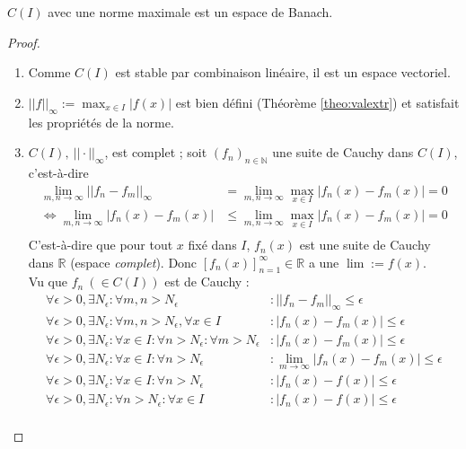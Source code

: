\begin{theo}
    $C(I)$ avec une norme maximale est un espace de Banach.
\end{theo}

\begin{proof}
    \begin{enumerate}[label=(\roman*)]
        \item Comme $C(I)$ est stable par combinaison linéaire, il est un espace vectoriel.
        \item $||f||_\infty := \max_{x\in I}|f(x)|$ est bien défini (Théorème \ref{theo:valextr}) et satisfait les propriétés de la norme.
        \item $C(I),\ ||\cdot||_\infty$, est complet ; soit $(f_n)_{n\in\mathbb{N}}$ une suite de Cauchy dans $C(I)$, c'est-à-dire
        \begin{align*}
            \lim_{m,n\rightarrow\infty} ||f_n-f_m||_\infty & = \lim_{m,n\rightarrow\infty} \max_{x\in I} |f_n(x) - f_m(x)| = 0 \nonumber\\
            \iff \lim_{m,n\rightarrow\infty} |f_n(x) - f_m(x)| & \leq \lim_{m,n\rightarrow\infty} \max_{x\in I} |f_n(x) - f_m(x)| = 0 \nonumber \\
        \end{align*}
        C'est-à-dire que pour tout $x$ fixé dans $I$, $f_n(x)$ est une suite de Cauchy dans $\mathbb{R}$ (espace \textit{complet}). Donc $[f_n(x)]_{n=1}^\infty \in \mathbb{R}$ a une $\lim := f(x)$. \\ Vu que $f_n\ (\in C(I))$ est de Cauchy :
        \begin{align*}
            \forall\epsilon>0,\exists N_\epsilon:\forall m,n>N_\epsilon & : ||f_n-f_m||_\infty\leq\epsilon \\
            \forall\epsilon>0,\exists N_\epsilon:\forall m,n>N_\epsilon,\forall x\in I & : |f_n(x)-f_m(x)|\leq\epsilon \\
            \forall\epsilon>0,\exists N_\epsilon:\forall x\in I:\forall n>N_\epsilon:\forall m>N_\epsilon & : |f_n(x)-f_m(x)|\leq\epsilon \\
            \forall\epsilon>0,\exists N_\epsilon:\forall x\in I:\forall n>N_\epsilon & : \lim \limits_{m\to\infty} |f_n(x)-f_m(x)|\leq\epsilon \\
            \forall\epsilon>0,\exists N_\epsilon:\forall x\in I:\forall n>N_\epsilon & : |f_n(x)-f(x)|\leq\epsilon \\
            \forall\epsilon>0,\exists N_\epsilon:\forall n>N_\epsilon:\forall x\in I & : |f_n(x)-f(x)|\leq\epsilon\\

\end{align*}
\end{enumerate}
\end{proof}
